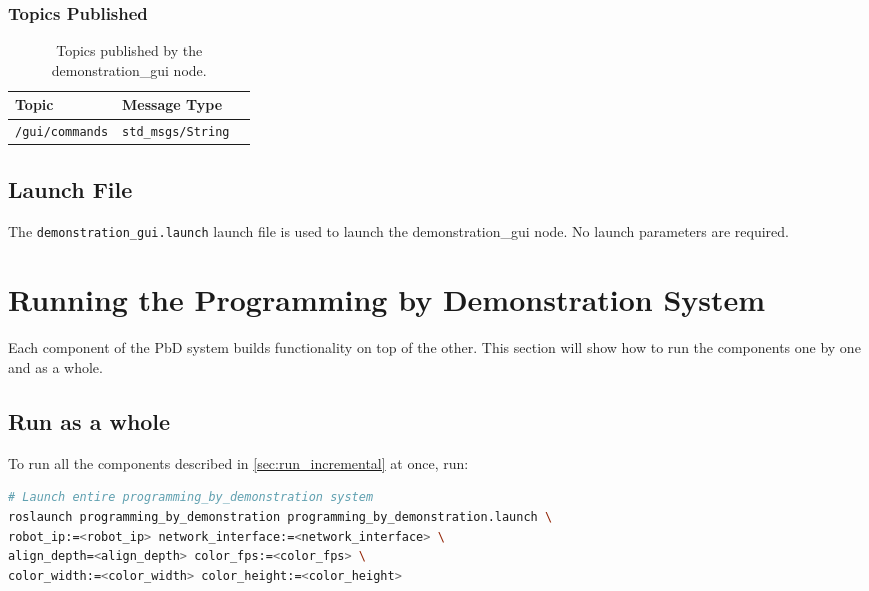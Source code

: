 \documentclass{CSSRforAfrica}
\begin{document}
\subsubsection*{Topics Published}

\begin{longtable}[c]{|l|l|l|}
    \caption{Topics published by the demonstration\_gui node.} \label{tab:Published_topics} \\
    \hline
    \rowcolor{gray!30}
    \footnotesize{\textbf{Topic}} & \footnotesize{\textbf{Message Type}} \\ \hline
    \endhead %
    
    \footnotesize{\texttt{/gui/commands}} & \footnotesize{\texttt{std\_msgs/String}} \\ \hline

\end{longtable}

\subsection*{Launch File}
The \texttt{demonstration\_gui.launch} launch file is used to launch the demonstration\_gui node. No launch parameters are required.

\clearpage

\vspace{1em}
\section{Running the Programming by Demonstration System} \label{sec:run}
Each component of the PbD system builds functionality on top of the other. This section will show how to run the components one by one and as a whole. 


\subsection{Run as a whole}
To run all the components described in \ref{sec:run_incremental} at once, run:
\begin{lstlisting}[style=withoutNumbering, language=bash]
# Launch entire programming_by_demonstration system
roslaunch programming_by_demonstration programming_by_demonstration.launch \
robot_ip:=<robot_ip> network_interface:=<network_interface> \
align_depth=<align_depth> color_fps:=<color_fps> \
color_width:=<color_width> color_height:=<color_height> 
\end{lstlisting}
\end{document}
